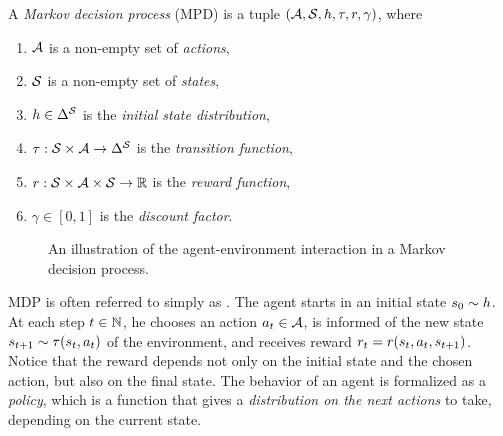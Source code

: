 \begin{defi}\label{def:mdp}
	A \emph{Markov decision process} (MPD) is a tuple $ \left( \mathcal{A}, \mathcal{S}, h, \tau, r, \gamma \right) $, where \begin{enumerate}[ ]
		\item $ \mathcal{A} $ is a non-empty set of \emph{actions},
		\item $ \mathcal{S} $ is a non-empty set of \emph{states},
		\item $ h \in \Delta^{\mathcal{S}} $ is the \emph{initial state distribution},
		\item $ \tau: \mathcal{S} \times \mathcal{A} \to \Delta^{\mathcal{S}} $ is the \emph{transition function},
		\item $ r: \mathcal{S} \times \mathcal{A} \times \mathcal{S} \to \mathbb{R} $ is the \emph{reward function},
		\item $ \gamma \in \left[ 0,1 \right] $ is the \emph{discount factor}.
	\end{enumerate}
\end{defi}

\begin{figure*}[t!]
	\centering
	\caption{An illustration of the agent-environment interaction in a Markov decision process.}
\end{figure*}

MDP is often referred to simply as .
The agent starts in an initial state $ s_0 \sim h $.
At each step $ t \in \mathbb{N} $, he chooses an action $ a_t \in \mathcal{A} $, is informed of the new state $ s_{t+1} \sim \tau\!\left(s_{t}, a_t\right) $ of the environment, and receives reward $ r_t = r\!\left(s_{t}, a_t, s_{t+1}\right) $.
Notice that the reward depends not only on the initial state and the chosen action, but also on the final state.
The behavior of an agent is formalized as a \emph{policy}, which is a function that gives a \emph{distribution on the next actions} to take, depending on the current state.

